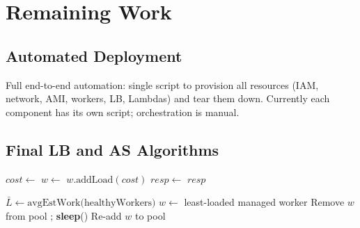 \documentclass[10pt,twocolumn]{article}
\begin{document}
\section{Remaining Work}

\subsection{Automated Deployment}

Full end-to-end automation: single script to provision all resources (IAM, network, AMI, workers, LB, Lambdas) and tear them down. Currently each component has its own script; orchestration is manual.

\subsection{Final LB and AS Algorithms}

\vspace{-2pt}
\begin{algorithm}[H]
\caption{Load Balancing with Lambda Fallback}\label{alg:lb}
\begin{algorithmic}[1]
\small
{}
  \State $cost \gets$ 
    \State \Return {} 
  \EndIf
  \State $w \gets$  
  \State $w.\text{addLoad}(cost)$
  \State $resp \gets$ 
   \Return {}
  \EndIf
  \State \Return $resp$
\EndProcedure
\end{algorithmic}
\end{algorithm}
\vspace{-4pt}
\begin{algorithm}[H]
\caption{Auto-Scaling with Safe Drain}\label{alg:as}
\begin{algorithmic}[1]
\small
{}
  \State $\bar{L} \gets \text{avgEstWork(healthyWorkers)}$
   \Return \EndIf
    \State {}
    \State $w \gets$ least-loaded managed worker
    \State Remove $w$ from pool
    \State {}
  \EndIf
\EndProcedure
{}
     ; \Return \EndIf
    \State \textbf{sleep}()
  \EndFor
  \State Re-add $w$ to pool 
\EndProcedure
\end{algorithmic}
\end{algorithm}
\vspace{-4pt}
\end{document}
